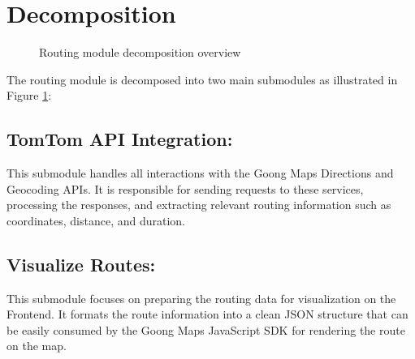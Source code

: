 \section{Decomposition}



\begin{figure}[H]
    \centering
    \caption{Routing module decomposition overview}
    \label{fig:routing-decomposition}
\end{figure}

The routing module is decomposed into two main submodules as illustrated in Figure \ref{fig:routing-decomposition}:

\subsection{TomTom API Integration:} This submodule handles all interactions with the Goong Maps Directions and Geocoding APIs. It is responsible for sending requests to these services, processing the responses, and extracting relevant routing information such as coordinates, distance, and duration.
    
\subsection{Visualize Routes:} This submodule focuses on preparing the routing data for visualization on the Frontend. It formats the route information into a clean JSON structure that can be easily consumed by the Goong Maps JavaScript SDK for rendering the route on the map.

